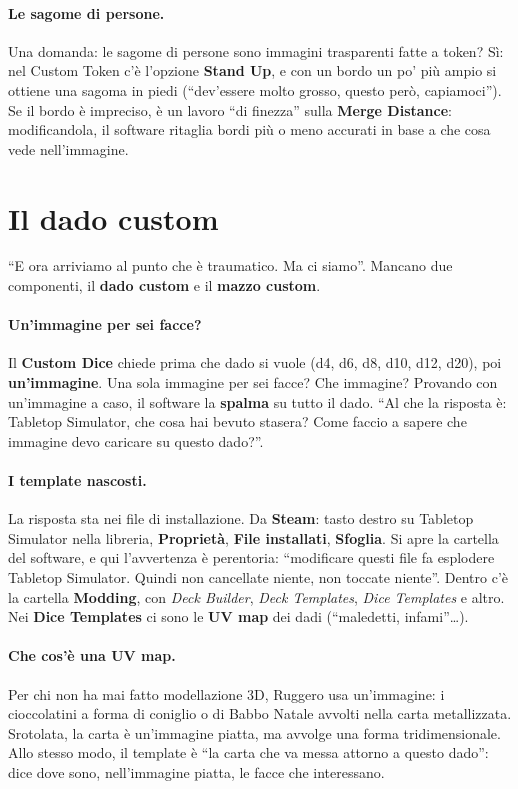 \paragraph{Le sagome di persone.} Una domanda: le sagome di persone sono immagini
trasparenti fatte a token? Sì: nel Custom Token c'è l'opzione \textbf{Stand Up}, e con
un bordo un po' più ampio si ottiene una sagoma in piedi (``dev'essere molto grosso,
questo però, capiamoci''). Se il bordo è impreciso, è un lavoro ``di finezza'' sulla
\textbf{Merge Distance}: modificandola, il software ritaglia bordi più o meno accurati
in base a che cosa vede nell'immagine.

\section{Il dado custom}
\label{a8:sec:dado}

``E ora arriviamo al punto che è traumatico. Ma ci siamo''. Mancano due componenti, il
\textbf{dado custom} e il \textbf{mazzo custom}.

\paragraph{Un'immagine per sei facce?} Il \textbf{Custom Dice} chiede prima che dado
si vuole (d4, d6, d8, d10, d12, d20), poi \textbf{un'immagine}. Una sola immagine per
sei facce? Che immagine? Provando con un'immagine a caso, il software la
\textbf{spalma} su tutto il dado. ``Al che la risposta è: Tabletop Simulator, che cosa
hai bevuto stasera? Come faccio a sapere che immagine devo caricare su questo dado?''.

\paragraph{I template nascosti.} La risposta sta nei file di installazione. Da
\textbf{Steam}: tasto destro su Tabletop Simulator nella libreria, \textbf{Proprietà},
\textbf{File installati}, \textbf{Sfoglia}. Si apre la cartella del software, e qui
l'avvertenza è perentoria: ``modificare questi file fa esplodere Tabletop Simulator.
Quindi non cancellate niente, non toccate niente''. Dentro c'è la cartella
\textbf{Modding}, con \emph{Deck Builder}, \emph{Deck Templates}, \emph{Dice
Templates} e altro. Nei \textbf{Dice Templates} ci sono le \textbf{UV map} dei dadi
(``maledetti, infami''\ldots).

\paragraph{Che cos'è una UV map.} Per chi non ha mai fatto modellazione 3D, Ruggero usa
un'immagine: i cioccolatini a forma di coniglio o di Babbo Natale avvolti nella carta
metallizzata. Srotolata, la carta è un'immagine piatta, ma avvolge una forma
tridimensionale. Allo stesso modo, il template è ``la carta che va messa attorno a
questo dado'': dice dove sono, nell'immagine piatta, le facce che interessano.

